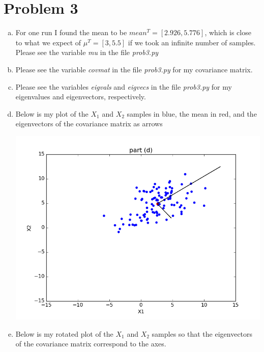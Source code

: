 \documentclass{article}
\begin{document}
\section*{Problem 3}
\begin{enumerate}[a)]
  \item For one run I found the mean to be $mean^T = \left[2.926, 5.776\right]$, which is close to what we expect of $\mu^T = \left[3, 5.5\right]$ if we took an infinite number of samples. Please see the variable \textit{mu} in the file \textit{prob3.py}
  \item Please see the variable \textit{covmat} in the file \textit{prob3.py} for my covariance matrix.
  \item Please see the variables \textit{eigvals} and \textit{eigvecs} in the file \textit{prob3.py} for my eigenvalues and eigenvectors, respectively.
  \item Below is my plot of the $X_1$ and $X_2$ samples in blue, the mean in red, and the eigenvectors of the covariance matrix as arrows
    \begin{center}
      \includegraphics[scale=0.5]{prob3d}
    \end{center}
  \item Below is my rotated plot of the $X_1$ and $X_2$ samples so that the eigenvectors of the covariance matrix correspond to the axes.


\end{enumerate}
\end{document}
